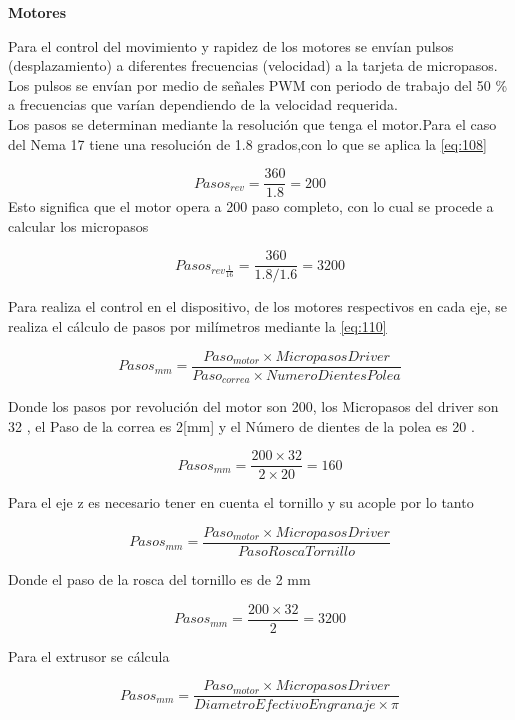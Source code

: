\textbf{Motores}

Para el control del movimiento y rapidez de los motores se envían pulsos (desplazamiento) a diferentes frecuencias (velocidad) a la tarjeta de micropasos. Los pulsos se envían por medio de señales PWM con periodo de trabajo del 50 \% a frecuencias que varían dependiendo de la velocidad requerida.\\

Los pasos se determinan mediante la resolución que tenga el motor.Para el caso del Nema 17 tiene una resolución de
1.8 grados,con lo que se aplica la \autoref{eq:108}

\begin{equation}
Pasos_{rev}=\frac{360}{1.8}=200 
    \label{eq:108}
\end{equation}
Esto significa que el motor opera a 200 paso completo, con lo cual se procede a calcular los micropasos

\begin{equation}
Pasos_{rev\frac{1}{16}}=\frac{360}{1.8/1.6}=3200 
    \label{eq:109}
\end{equation}

Para realiza el control en el dispositivo, de los motores respectivos en cada eje, se realiza el cálculo de pasos por milímetros mediante la \autoref{eq:110}


\begin{equation}
Pasos_{mm}=\frac{Paso_{motor}\times Micropasos Driver}{Paso_{correa}\times NumeroDientesPolea} 
    \label{eq:110}
\end{equation}

Donde los pasos por revolución del motor son 200, los Micropasos del driver son 32 , el Paso de la correa es 2[mm] y el Número de dientes de la polea es 20 .

\[Pasos_{mm}=\frac{200\times 32}{2\times 20}=160 \]

Para el eje z es necesario tener en cuenta el tornillo y su acople por lo tanto

\begin{equation}
Pasos_{mm}=\frac{Paso_{motor}\times Micropasos Driver}{PasoRoscaTornillo} 
    \label{eq:111}
\end{equation}

Donde el paso de la rosca del tornillo es de 2 mm 

\[Pasos_{mm}=\frac{200\times 32}{2}=3200 \]

Para el extrusor se cálcula

\begin{equation}
Pasos_{mm}=\frac{Paso_{motor}\times Micropasos Driver}{DiametroEfectivoEngranaje\times \pi} 
    \label{eq:112}
\end{equation}

